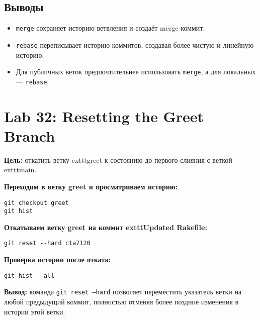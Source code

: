 \documentclass[a4paper,12pt]{report}
\begin{document}
\subsection*{Выводы}
\begin{itemize}
  \item \texttt{merge} сохраняет историю ветвления и создаёт merge-коммит.
  \item \texttt{rebase} переписывает историю коммитов, создавая более чистую и линейную историю.
  \item Для публичных веток предпочтительнее использовать \texttt{merge}, а для локальных — \texttt{rebase}.
\end{itemize}


\section{Lab 32: Resetting the Greet Branch}

\textbf{Цель:} откатить ветку 	exttt{greet} к состоянию до первого слияния с веткой 	exttt{main}.

\textbf{Переходим в ветку greet и просматриваем историю:}
\begin{verbatim}
git checkout greet
git hist
\end{verbatim}


\textbf{Откатываем ветку greet на коммит 	exttt{Updated Rakefile}:}
\begin{verbatim}
git reset --hard c1a7120
\end{verbatim}


\textbf{Проверка истории после отката:}
\begin{verbatim}
git hist --all
\end{verbatim}


\textbf{Вывод:} команда \texttt{git reset --hard} позволяет переместить указатель ветки на любой предыдущий коммит, полностью отменяя более поздние изменения в истории этой ветки.
\end{document}
